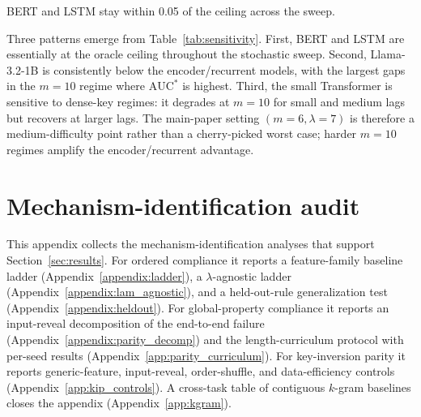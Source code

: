 \documentclass{article} %
\theoremstyle{plain}
\theoremstyle{definition}
\theoremstyle{remark}
\begin{document}
BERT and LSTM stay within 0.05 of the ceiling across the sweep.

Three patterns emerge from Table~\ref{tab:sensitivity}. First, BERT and LSTM are essentially at the oracle ceiling throughout the stochastic sweep. Second, Llama-3.2-1B is consistently below the encoder/recurrent models, with the largest gaps in the \(m=10\) regime where \(\mathrm{AUC}^*\) is highest. Third, the small Transformer is sensitive to dense-key regimes: it degrades at \(m=10\) for small and medium lags but recovers at larger lags. The main-paper setting \((m=6,\lambda=7)\) is
therefore a medium-difficulty point rather than a cherry-picked worst case;
harder \(m=10\) regimes amplify the encoder/recurrent advantage.

\section{Mechanism-identification audit}
\label{appendix:mechanism_id}
This appendix collects the mechanism-identification analyses that support Section~\ref{sec:results}. For ordered compliance it reports a feature-family baseline ladder (Appendix~\ref{appendix:ladder}), a $\lambda$-agnostic ladder (Appendix~\ref{appendix:lam_agnostic}), and a held-out-rule generalization test (Appendix~\ref{appendix:heldout}). For global-property compliance it reports an input-reveal decomposition of the end-to-end failure (Appendix~\ref{appendix:parity_decomp}) and the length-curriculum protocol with per-seed results (Appendix~\ref{app:parity_curriculum}). For key-inversion parity it reports generic-feature, input-reveal, order-shuffle, and data-efficiency controls (Appendix~\ref{app:kip_controls}). A cross-task table of contiguous $k$-gram baselines closes the appendix (Appendix~\ref{app:kgram}).
\end{document}
